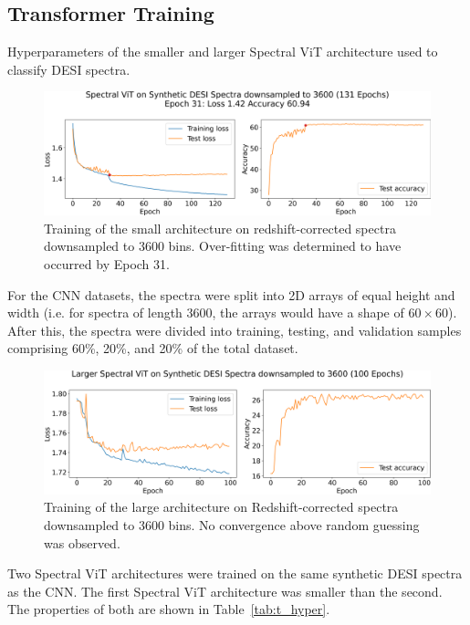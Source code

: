 \subsection{Transformer Training}
\label{sec:transformer_training}
\begin{table}[t!]
    \small
    \centering
    \sffamily
    
    \caption{Hyperparameters of the smaller and larger Spectral ViT architecture used to classify DESI spectra.}
    \label{tab:t_hyper}
\end{table}

\begin{figure}[b!]
    \centering
    \includegraphics[width=.85\linewidth]{figures/v1_real/vit_model_V1_original_redotraining_new.png}
    \caption[Training of Spectral ViT: V1]{Training of the small architecture on redshift-corrected spectra downsampled to 3600 bins. Over-fitting was determined to have occurred by Epoch 31.}
    \label{fig:vit1_training}
\end{figure}
For the CNN datasets, the spectra were split into 2D arrays of equal height and width 
(i.e. for spectra of length 3600, the arrays would have a shape of $60\times60$). 
After this, the spectra were divided into training, testing, and validation samples comprising 60\%, 20\%, and 20\% of the total dataset.


\begin{figure}[t!]
    \centering
    \includegraphics[width=.85\linewidth]{figures/v1_real/vit_model_V1_bigtraining_new.png}
    \caption[Training of Spectral ViT: V1 Big]{Training of the large architecture on Redshift-corrected spectra downsampled to 3600 bins. No convergence above random guessing was observed. }
    \label{fig:vit1_big_training}
\end{figure}
Two Spectral ViT architectures were trained on the same synthetic DESI spectra as the CNN.
The first Spectral ViT architecture was smaller than the second. The properties 
of both are shown in Table~\ref{tab:t_hyper}. 

